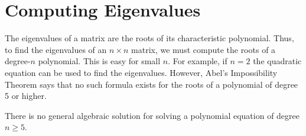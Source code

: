 \section*{Computing Eigenvalues} %

The eigenvalues of a matrix are the roots of its characteristic polynomial.
Thus, to find the eigenvalues of an $n \times n$ matrix, we must compute the roots of a degree-$n$ polynomial.
This is easy for small $n$.
For example, if $n=2$ the quadratic equation can be used to find the eigenvalues.
However, Abel's Impossibility Theorem says that no such formula exists for the roots of a polynomial of degree 5 or higher.

\begin{theorem}
There is no general algebraic solution for solving a polynomial equation of degree $n\geq5$.
\label{thm:Abel}
\end{theorem}

